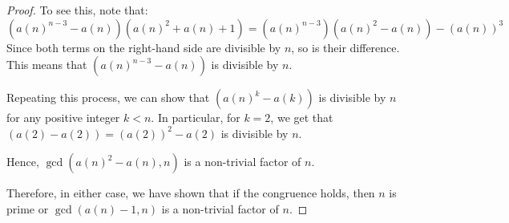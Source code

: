\documentclass{article}
\begin{document}
\begin{proof}
To see this, note that:
\[
(a(n)^{n-3} - a(n))(a(n)^2 + a(n) + 1) = (a(n)^{n-3})(a(n)^2 - a(n)) - (a(n))^3
\]
Since both terms on the right-hand side are divisible by $n$, so is their difference. This means that $(a(n)^{n-3} - a(n))$ is divisible by $n$. 

Repeating this process, we can show that $(a(n)^{k} - a(k))$ is divisible by $n$ for any positive integer $k < n$. In particular, for $k = 2$, we get that $(a(2) - a(2)) = (a(2))^2 - a(2)$ is divisible by $n$. 

Hence, $\gcd(a(n)^2 - a(n), n)$ is a non-trivial factor of $n$. 

Therefore, in either case, we have shown that if the congruence holds, then $n$ is prime or $\gcd(a(n) - 1, n)$ is a non-trivial factor of $n$.
\end{proof}
\end{document}
